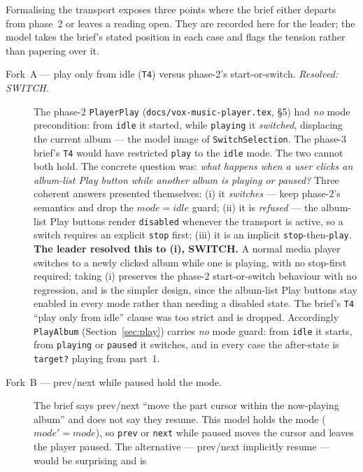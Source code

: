 \documentclass[a4paper,10pt,fleqn]{article}
\begin{document}
Formalising the transport exposes three points where the brief either departs
from phase~2 or leaves a reading open. They are recorded here for the leader; the
model takes the brief's stated position in each case and flags the tension rather
than papering over it.

\begin{description}
  \item[Fork~A --- play only from idle (\texttt{T4}) versus phase-2's
    start-or-switch. \emph{Resolved: SWITCH.}] The phase-2 \texttt{PlayerPlay}
    (\texttt{docs/vox-music-player.tex}, \S5) had \emph{no} mode precondition: from
    \texttt{idle} it started, while \texttt{playing} it \emph{switched},
    displacing the current album --- the model image of
    \texttt{SwitchSelection}. The phase-3 brief's \texttt{T4} would have
    restricted \texttt{play} to the \texttt{idle} mode. The two cannot both
    hold. The concrete question was: \emph{what happens when a user clicks an
    album-list Play button while another album is playing or paused?} Three
    coherent answers presented themselves: (i) it \emph{switches} --- keep
    phase-2's semantics and drop the $mode = idle$ guard; (ii) it is
    \emph{refused} --- the album-list Play buttons render \texttt{disabled}
    whenever the transport is active, so a switch requires an explicit
    \texttt{stop} first; (iii) it is an implicit \texttt{stop}-then-\texttt{play}.
    \textbf{The leader resolved this to (i), SWITCH.} A normal media player
    switches to a newly clicked album while one is playing, with no stop-first
    required; taking (i) preserves the phase-2 start-or-switch behaviour with no
    regression, and is the simpler design, since the album-list Play buttons
    stay enabled in every mode rather than needing a disabled state. The brief's
    \texttt{T4} ``play only from idle'' clause was too strict and is dropped.
    Accordingly \texttt{PlayAlbum} (Section~\ref{sec:play}) carries \emph{no}
    mode guard: from \texttt{idle} it starts, from \texttt{playing} or
    \texttt{paused} it switches, and in every case the after-state is
    \texttt{target?} playing from part~1.
  \item[Fork~B --- prev/next while paused hold the mode.] The brief says
    prev/next ``move the part cursor within the now-playing album'' and does not
    say they resume. This model holds the mode ($mode' = mode$), so \texttt{prev}
    or \texttt{next} while paused moves the cursor and leaves the player paused.
    The alternative --- prev/next implicitly resume --- would be surprising and is

\end{description}
\end{document}
